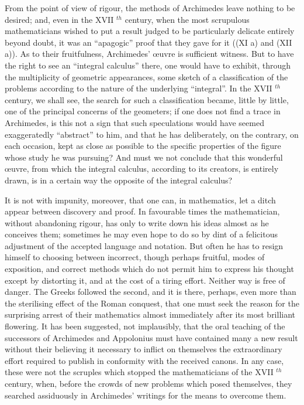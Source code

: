 From the point of view of rigour, the methods of Archimedes leave nothing to be desired; and, even in the XVII \(^{th}\) century, when the most scrupulous mathematicians wished to put a result judged to be particularly delicate entirely beyond doubt, it was an ``apagogic'' proof that they gave for it ((XI a) and (XII a)). As to their fruitfulness, Archimedes' œuvre is sufficient witness. But to have the right to see an ``integral calculus'' there, one would have to exhibit, through the multiplicity of geometric appearances, some sketch of a classification of the problems according to the nature of the underlying ``integral''. In the XVII \(^{th}\) century, we shall see, the search for such a classification became, little by little, one of the principal concerns of the geometers; if one does not find a trace in Archimedes, is this not a sign that such speculations would have seemed exaggeratedly ``abstract'' to him, and that he has deliberately, on the contrary, on each occasion, kept as close as possible to the specific properties of the figure whose study he was pursuing? And must we not conclude that this wonderful œuvre, from which the integral calculus, according to its creators, is entirely drawn, is in a certain way the opposite of the integral calculus?

It is not with impunity, moreover, that one can, in mathematics, let a ditch appear between discovery and proof. In favourable times the mathematician, without abandoning rigour, has only to write down his ideas almost as he conceives them; sometimes he may even hope to do so by dint of a felicitous adjustment of the accepted language and notation. But often he has to resign himself to choosing between incorrect, though perhaps fruitful, modes of exposition, and correct methods which do not permit him to express his thought except by distorting it, and at the cost of a tiring effort. Neither way is free of danger. The Greeks followed the second, and it is there, perhaps, even more than the sterilising effect of the Roman conquest, that one must seek the reason for the surprising arrest of their mathematics almost immediately after its most brilliant flowering. It has been suggested, not implausibly, that the oral teaching of the successors of Archimedes and Appolonius must have contained many a new result without their believing it necessary to inflict on themselves the extraordinary effort required to publish in conformity with the received canons. In any case, these were not the scruples which stopped the mathematicians of the XVII \(^{th}\) century, when, before the crowds of new problems which posed themselves, they searched assiduously in Archimedes' writings for the means to overcome them.

